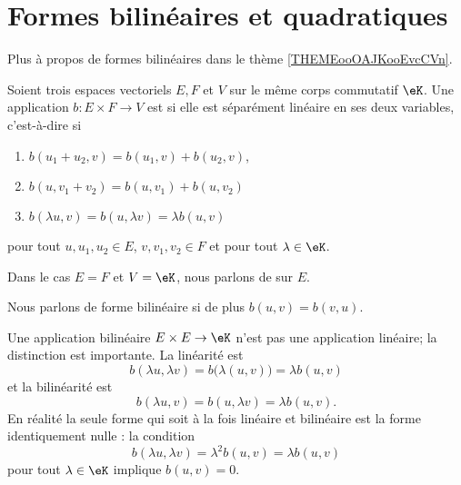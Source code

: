 \section{Formes bilinéaires et quadratiques}

Plus à propos de formes bilinéaires dans le thème \ref{THEMEooOAJKooEvcCVn}.

\begin{definition}      \label{DEFooEEQGooNiPjHz}
    Soient trois espaces vectoriels \( E,F\) et \( V\) sur le même corps commutatif \( \eK\). Une application \( b\colon E\times F\to V\) est  si elle est séparément linéaire en ses deux variables, c'est-à-dire si
    \begin{enumerate}
        \item 
            \( b(u_1+u_2,v)=b(u_1,v)+b(u_2,v)\),
        \item
            \( b(u,v_1+v_2)=b(u,v_1)+b(u,v_2)\)
        \item
            \( b(\lambda u,v)=b(u,\lambda v)=\lambda b(u,v)\)
    \end{enumerate}
    pour tout \( u,u_1,u_2\in E\), \( v,v_1,v_2\in F\) et pour tout \( \lambda\in \eK\).

    Dans le cas \( E=F\) et \( V=\eK\), nous parlons de  sur \( E\).

    Nous parlons de forme bilinéaire  si de plus \( b(u,v)=b(v,u)\).
\end{definition}

\begin{normaltext}
    Une application bilinéaire \( E\times E\to \eK\) n'est pas une application linéaire; la distinction est importante. La linéarité est
    \begin{equation}
        b(\lambda u,\lambda v)= b\big( \lambda(u,v) \big)=\lambda b(u,v)
    \end{equation}
    et la bilinéarité est
    \begin{equation}
        b(\lambda u,v)=b(u,\lambda v)=\lambda b(u,v).
    \end{equation}
    En réalité la seule forme qui soit à la fois linéaire et bilinéaire est la forme identiquement nulle : la condition
    \begin{equation}
        b(\lambda u,\lambda v)=\lambda^2b(u,v)=\lambda b(u,v)
    \end{equation}
    pour tout \( \lambda\in \eK\) implique \( b(u,v)=0\).
\end{normaltext}

